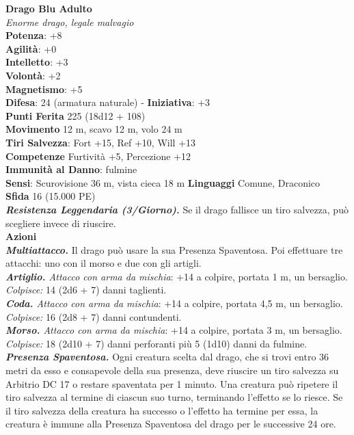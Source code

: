 \begin{multicols}{2}
\medskip\textbf{Drago Blu Adulto}\\
\emph{Enorme drago, legale malvagio}\\
\textbf{Potenza}: +8\\
\textbf{Agilità}: +0\\
\textbf{Intelletto}: +3\\
\textbf{Volontà}: +2\\
\textbf{Magnetismo}: +5\\
\textbf{Difesa}: 24 (armatura naturale) - \textbf{Iniziativa}: +3\\
\textbf{Punti Ferita} 225 (18d12 + 108)\\
\textbf{Movimento} 12 m, scavo 12 m, volo 24 m\\
\textbf{Tiri Salvezza}: Fort +15, Ref +10, Will +13\\
\textbf{Competenze} Furtività +5, Percezione +12\\
\textbf{Immunità al Danno}: fulmine\\
\textbf{Sensi}: Scurovisione 36 m, vista cieca 18 m
\textbf{Linguaggi} Comune, Draconico\\
\textbf{Sfida} 16 (15.000 PE)\smallskip\\
\emph{\textbf{Resistenza Leggendaria (3/Giorno).}} Se il drago fallisce un tiro salvezza, può scegliere invece di riuscire.\\
\smallskip\textbf{Azioni}\\
\emph{\textbf{Multiattacco.}} Il drago può usare la sua Presenza Spaventosa. Poi effettuare tre attacchi: uno con il morso e due con gli artigli.\\
\emph{\textbf{Artiglio.} Attacco con arma da mischia}: +14 a colpire, portata 1 m, un bersaglio.\\
\emph{Colpisce:} 14 (2d6 + 7) danni taglienti.\\
\emph{\textbf{Coda.} Attacco con arma da mischia}: +14 a colpire, portata 4,5 m, un bersaglio.\\
\emph{Colpisce:} 16 (2d8 + 7) danni contundenti.\\
\emph{\textbf{Morso.} Attacco con arma da mischia}: +14 a colpire, portata 3 m, un bersaglio.\\
\emph{Colpisce:} 18 (2d10 + 7) danni perforanti più 5 (1d10) danni da fulmine.\\
\emph{\textbf{Presenza Spaventosa.}} Ogni creatura scelta dal drago, che si trovi entro 36 metri da esso e consapevole della sua presenza, deve riuscire un tiro salvezza su Arbitrio DC 17 o restare spaventata per 1 minuto. Una creatura può ripetere il tiro salvezza al termine di ciascun suo turno, terminando l'effetto se lo riesce. Se il tiro salvezza della creatura ha successo o l'effetto ha termine per essa, la creatura è immune alla Presenza Spaventosa del drago per le successive 24 ore.\\

\end{multicols}
